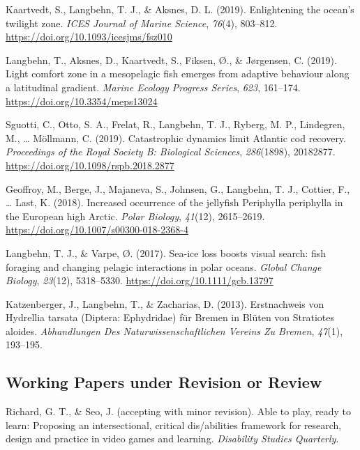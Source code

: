 \documentclass[11pt, a4paper]{awesome-cv}
\begin{document}
\leavevmode\hypertarget{ref-Kaartvedt2019b}{}%
Kaartvedt, S., Langbehn, T. J., \& Aksnes, D. L. (2019). Enlightening
the ocean's twilight zone. \emph{ICES Journal of Marine Science},
\emph{76}(4), 803--812. \url{https://doi.org/10.1093/icesjms/fsz010}

\leavevmode\hypertarget{ref-Langbehn2019a}{}%
Langbehn, T., Aksnes, D., Kaartvedt, S., Fiksen, Ø., \& Jørgensen, C.
(2019). Light comfort zone in a mesopelagic fish emerges from adaptive
behaviour along a latitudinal gradient. \emph{Marine Ecology Progress
Series}, \emph{623}, 161--174. \url{https://doi.org/10.3354/meps13024}

\leavevmode\hypertarget{ref-Sguotti}{}%
Sguotti, C., Otto, S. A., Frelat, R., Langbehn, T. J., Ryberg, M. P.,
Lindegren, M., \ldots{} Möllmann, C. (2019). Catastrophic dynamics limit
Atlantic cod recovery. \emph{Proceedings of the Royal Society B:
Biological Sciences}, \emph{286}(1898), 20182877.
\url{https://doi.org/10.1098/rspb.2018.2877}

\leavevmode\hypertarget{ref-Geoffroy2018}{}%
Geoffroy, M., Berge, J., Majaneva, S., Johnsen, G., Langbehn, T. J.,
Cottier, F., \ldots{} Last, K. (2018). Increased occurrence of the
jellyfish Periphylla periphylla in the European high Arctic. \emph{Polar
Biology}, \emph{41}(12), 2615--2619.
\url{https://doi.org/10.1007/s00300-018-2368-4}

\leavevmode\hypertarget{ref-Langbehn2017}{}%
Langbehn, T. J., \& Varpe, Ø. (2017). Sea-ice loss boosts visual search:
fish foraging and changing pelagic interactions in polar oceans.
\emph{Global Change Biology}, \emph{23}(12), 5318--5330.
\url{https://doi.org/10.1111/gcb.13797}

\leavevmode\hypertarget{ref-Katzenberger2013}{}%
Katzenberger, J., Langbehn, T., \& Zacharias, D. (2013). Erstnachweis
von Hydrellia tarsata (Diptera: Ephydridae) für Bremen in Blüten von
Stratiotes aloides. \emph{Abhandlungen Des Naturwissenschaftlichen
Vereins Zu Bremen}, \emph{47}(1), 193--195.

\hypertarget{working-papers-under-revision-or-review}{%
\subsection{Working Papers under Revision or
Review}\label{working-papers-under-revision-or-review}}

\hypertarget{refs_working_paper}{}
\leavevmode\hypertarget{ref-dsq}{}%
Richard, G. T., \& Seo, J. (accepting with minor revision). Able to
play, ready to learn: Proposing an intersectional, critical
dis/abilities framework for research, design and practice in video games
and learning. \emph{Disability Studies Quarterly}.
\end{document}
